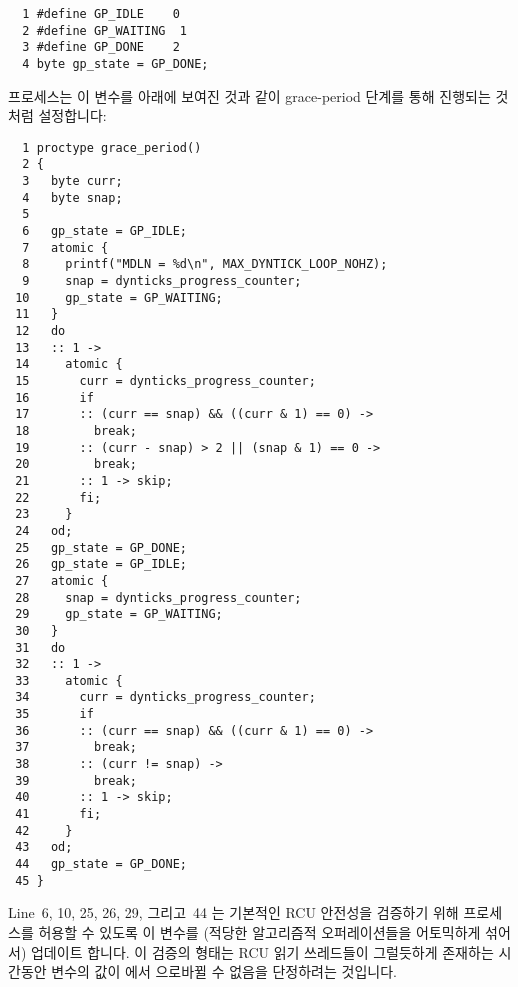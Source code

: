 \vspace{5pt}
\begin{minipage}[t]{\columnwidth}
\begin{verbatim}
  1 #define GP_IDLE    0
  2 #define GP_WAITING  1
  3 #define GP_DONE    2
  4 byte gp_state = GP_DONE;
\end{verbatim}
\end{minipage}
\vspace{5pt}

 프로세스는 이 변수를 아래에 보여진 것과 같이 grace-period
단계를 통해 진행되는 것처럼 설정합니다:
\iffalse

The \co{grace_period()} process sets this variable as it
progresses through the grace-period phases, as shown below:
\fi

{ \scriptsize
\begin{verbatim}
  1 proctype grace_period()
  2 {
  3   byte curr;
  4   byte snap;
  5
  6   gp_state = GP_IDLE;
  7   atomic {
  8     printf("MDLN = %d\n", MAX_DYNTICK_LOOP_NOHZ);
  9     snap = dynticks_progress_counter;
 10     gp_state = GP_WAITING;
 11   }
 12   do
 13   :: 1 ->
 14     atomic {
 15       curr = dynticks_progress_counter;
 16       if
 17       :: (curr == snap) && ((curr & 1) == 0) ->
 18         break;
 19       :: (curr - snap) > 2 || (snap & 1) == 0 ->
 20         break;
 21       :: 1 -> skip;
 22       fi;
 23     }
 24   od;
 25   gp_state = GP_DONE;
 26   gp_state = GP_IDLE;
 27   atomic {
 28     snap = dynticks_progress_counter;
 29     gp_state = GP_WAITING;
 30   }
 31   do
 32   :: 1 ->
 33     atomic {
 34       curr = dynticks_progress_counter;
 35       if
 36       :: (curr == snap) && ((curr & 1) == 0) ->
 37         break;
 38       :: (curr != snap) ->
 39         break;
 40       :: 1 -> skip;
 41       fi;
 42     }
 43   od;
 44   gp_state = GP_DONE;
 45 }
\end{verbatim}
}

Line~6, 10, 25, 26, 29, 그리고~44 는 기본적인 RCU 안전성을 검증하기 위해
 프로세스를 허용할 수 있도록 이 변수를 (적당한 알고리즘적
오퍼레이션들을 어토믹하게 섞어서) 업데이트 합니다.
이 검증의 형태는 RCU 읽기 쓰레드들이 그럴듯하게 존재하는 시간동안 
변수의 값이  에서  으로바뀔 수 없음을 단정하려는
것입니다.
\iffalse

Lines~6, 10, 25, 26, 29, and~44 update this variable (combining
atomically with algorithmic operations where feasible) to
allow the \co{dyntick_nohz()} process to verify the basic
RCU safety property.
The form of this verification is to assert that the value of the
\co{gp_state} variable cannot jump from
\co{GP_IDLE} to \co{GP_DONE} during a time period
over which RCU readers could plausibly persist.
\fi

